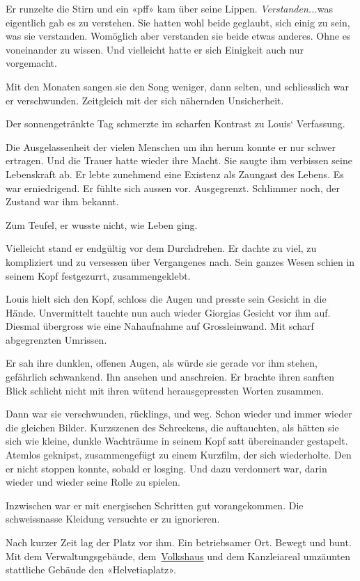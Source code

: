 Er runzelte die Stirn und ein «pff» kam über seine Lippen.
\emph{Verstanden...}was eigentlich gab es zu verstehen. Sie hatten wohl
beide geglaubt, sich einig zu sein, was sie verstanden. Womöglich aber
verstanden sie beide etwas anderes. Ohne es voneinander zu wissen. Und
vielleicht hatte er sich Einigkeit auch nur vorgemacht.

Mit den Monaten sangen sie den Song weniger, dann selten, und
schliesslich war er verschwunden. Zeitgleich mit der sich nähernden
Unsicherheit.

Der sonnengetränkte Tag schmerzte im scharfen Kontrast zu Louis`
Verfassung.

Die Ausgelassenheit der vielen Menschen um ihn herum konnte er nur
schwer ertragen. Und die Trauer hatte wieder ihre Macht. Sie saugte ihm
verbissen seine Lebenskraft ab. Er lebte zunehmend eine Existenz als
Zaungast des Lebens. Es war erniedrigend. Er fühlte sich aussen vor.
Ausgegrenzt. Schlimmer noch, der Zustand war ihm bekannt.

Zum Teufel, er wusste nicht, wie Leben ging.

Vielleicht stand er endgültig vor dem Durchdrehen. Er dachte zu viel, zu
kompliziert und zu versessen über Vergangenes nach. Sein ganzes Wesen
schien in seinem Kopf festgezurrt, zusammengeklebt.

Louis hielt sich den Kopf, schloss die Augen und presste sein Gesicht in
die Hände. Unvermittelt tauchte nun auch wieder Giorgias Gesicht vor ihm
auf. Diesmal übergross wie eine Nahaufnahme auf Grossleinwand. Mit
scharf abgegrenzten Umrissen.

Er sah ihre dunklen, offenen Augen, als würde sie gerade vor ihm stehen,
gefährlich schwankend. Ihn ansehen und anschreien. Er brachte ihren
sanften Blick schlicht nicht mit ihren wütend herausgepressten Worten
zusammen.

Dann war sie verschwunden, rücklings, und weg. Schon wieder und immer
wieder die gleichen Bilder. Kurzszenen des Schreckens, die auftauchten,
als hätten sie sich wie kleine, dunkle Wachträume in seinem Kopf satt
übereinander gestapelt. Atemlos geknipst, zusammengefügt zu einem
Kurzfilm, der sich wiederholte. Den er nicht stoppen konnte, sobald er
losging. Und dazu verdonnert war, darin wieder und wieder seine Rolle zu
spielen.

Inzwischen war er mit energischen Schritten gut vorangekommen. Die
schweissnasse Kleidung versuchte er zu ignorieren.

Nach kurzer Zeit lag der Platz vor ihm. Ein betriebsamer Ort. Bewegt und
bunt. Mit dem Verwaltungsgebäude,
dem~\href{https://de.wikipedia.org/wiki/Volkshaus_(Z\%C3\%BCrich)}{Volkshaus}
und dem Kanzleiareal umzäunten stattliche Gebäude den «Helvetiaplatz».

